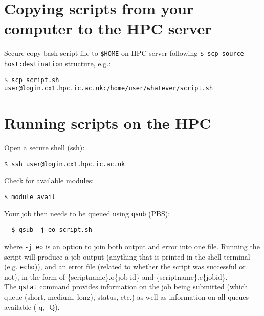 \section{Copying scripts from your computer to the HPC server}
 
Secure copy bash script file to {\tt \$HOME} on HPC server following
{\tt \$ scp source host:destination} structure, e.g.:

\begin{lstlisting}
$ scp script.sh user@login.cx1.hpc.ic.ac.uk:/home/user/whatever/script.sh
\end{lstlisting}

\section{Running scripts on the HPC}

Open a secure shell (ssh):

\begin{lstlisting}
$ ssh user@login.cx1.hpc.ic.ac.uk
\end{lstlisting}

Check for available modules:

\begin{lstlisting}
$ module avail
\end{lstlisting}

Your job then needs to be queued using {\tt qsub} (PBS):

\begin{lstlisting}
  $ qsub -j eo script.sh
\end{lstlisting}

where {\tt -j eo} is an option to join both output and error into one 
file. Running the script will produce a job output (anything that is 
printed in the shell terminal (e.g. {\tt echo})), and an error file 
(related to whether the script was successful or not), in the form of 
\{scriptname\}.o\{job id\} and \{scriptname\}.e\{jobid\}.\\

The {\tt qstat} command provides information on the job being submitted 
(which queue (short, medium, long), status, etc.) as well as 
information on all queues available (-q, -Q).
